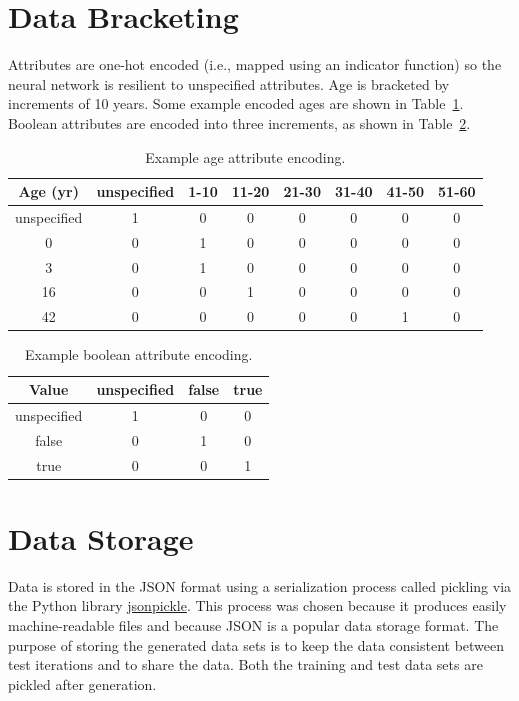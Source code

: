 \documentclass[paper=a4paper]{report}
\begin{document}
\FloatBarrier
\section{Data Bracketing}
\label{sec:data-bracketing}

Attributes are one-hot encoded (i.e., mapped using an indicator function) so the neural network is
resilient to unspecified attributes. Age is bracketed by increments of 10 years. Some example
encoded ages are shown in Table~\ref{tab:example_age_attribute_encoding}. Boolean attributes are
encoded into three increments, as shown in Table~\ref{tab:example_boolean_attribute_encoding}.
    
\begin{table}[h]
    \centering
    \begin{tabular}{c|c|c|c|c|c|c|c}
        Age (yr) & unspecified & 1-10 & 11-20 & 21-30 & 31-40 & 41-50 & 51-60 \\\hline
        unspecified & 1 & 0 & 0 & 0 & 0 & 0 & 0 \\
        0 & 0 & 1 & 0 & 0 & 0 & 0 & 0 \\
        3 & 0 & 1 & 0 & 0 & 0 & 0 & 0 \\
        16 & 0 & 0 & 1 & 0 & 0 & 0 & 0 \\
        42 & 0 & 0 & 0 & 0 & 0 & 1 & 0
    \end{tabular}
    \caption{Example age attribute encoding.}
    \label{tab:example_age_attribute_encoding}
\end{table}

\begin{table}[h]
    \centering
    \begin{tabular}{c|c|c|c}
        Value & unspecified & false & true \\\hline
        unspecified & 1 & 0 & 0 \\
        false & 0 & 1 & 0 \\
        true & 0 & 0 & 1
    \end{tabular}
    \caption{Example boolean attribute encoding.}
    \label{tab:example_boolean_attribute_encoding}
\end{table}

\FloatBarrier
\section{Data Storage}

Data is stored in the JSON format using a serialization process called pickling via the Python
library \href{https://jsonpickle.github.io/}{jsonpickle}. This process was chosen because it
produces easily machine-readable files and because JSON is a popular data storage format. The
purpose of storing the generated data sets is to keep the data consistent between test iterations
and to share the data. Both the training and test data sets are pickled after generation.
\end{document}
